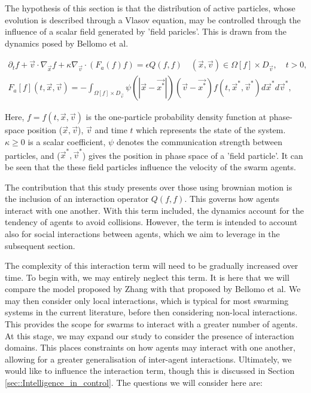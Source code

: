 \documentclass[.../main.tex]{subfiles}
\begin{document}
	The hypothesis of this section is that the distribution of active particles, whose evolution is
	described through a Vlasov equation, may be controlled through the influence of a scalar field
	generated by 'field paricles'. This is drawn from the dynamics posed by Bellomo et al. 
	\cite{Bellomo2017}

	\begin{equation}
	\label{eqn::Vlasov}
    \begin{split}    
        \partial_t f + \Vec{v} \cdot \nabla_{\Vec{x}} f + \kappa \nabla_{\Vec{v}} \cdot (F_a (f) f)
        = \epsilon Q(f, f) \quad  (\Vec{x}, \Vec{v}) \in \Omega[f] \times D_{\Vec{v}}, \quad t>0, \\
        F_a[f](t, \Vec{x}, \Vec{v}) = - \int_{\Omega [f] \times D_{\Vec{v}}} \psi (|\Vec{x} - \Vec
        {x^*}|)(\Vec{v} - \Vec{x^*}) f(t, \Vec{x}^*, \Vec{v}^*) d\Vec{x}^* d\Vec{v}^*, 
    \end{split}
    \end{equation}


    Here, $f = f(t, \Vec{x}, \Vec{v})$ is the one-particle probability density function at
    phase-space position ($\Vec{x}, \Vec{v}$), $\Vec{v}$ and time $t$ which represents the state of
    the system. $\kappa \geq 0$ is a scalar
    coefficient, $\psi$ denotes the communication strength between particles, and ($\Vec{x}^*, \Vec
    {v}^*$) gives the position in phase space of a 'field particle'. It can be seen that the these
    field particles influence the velocity of the swarm agents.

	The contribution that this study presents over those using brownian motion is the inclusion of an
	interaction operator $Q(f, f)$. This governs how agents interact with one another. With this
	term included, the dynamics account for the tendency of agents to avoid collisions. However,
	the term is intended to account also for social interactions between agents, which we aim to
	leverage in the subsequent section.

	The complexity of this interaction term will need to be gradually increased over time. To begin
	with, we may entirely neglect this term. It is here that we will compare the model proposed by Zhang
	with that proposed by Bellomo et al. We may then consider only local interactions, which is typical
	for most swarming systems in the current literature, before then considering non-local interactions.
	This provides the scope for swarms to interact with a greater number of agents. At this stage, we
	may expand our study to consider the presence of interaction domains. This places constraints on how
	agents may interact with one another, allowing for a greater generalisation of inter-agent
	interactions. Ultimately, we would like to influence the interaction term, though this is discussed
	in Section \ref{sec::Intelligence_in_control}. The questions we will
	consider here are:
\end{document}
